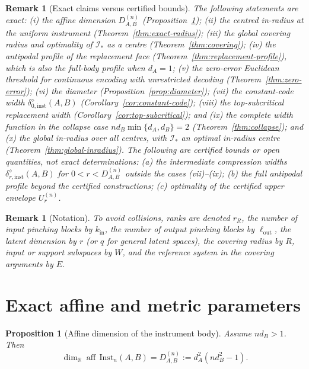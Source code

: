 \documentclass[11pt,a4paper]{article}
\newtheorem{proposition}[theorem]{Proposition}
\newtheorem{remark}[theorem]{Remark}
\newcommand{\Inst}{\mathrm{Inst}}
\newcommand{\aff}{\operatorname{aff}}
\begin{document}
\begin{remark}[Exact claims versus certified bounds]
\label{rem:exact-vs-certified}
The following statements are exact: (i) the affine dimension $D_{A,B}^{(n)}$ (Proposition~\ref{prop:dimension}); (ii) the centred in-radius at the uniform instrument (Theorem~\ref{thm:exact-radius}); (iii) the global covering radius and optimality of $\mathcal I_*$ as a centre (Theorem~\ref{thm:covering}); (iv) the antipodal profile of the replacement face (Theorem~\ref{thm:replacement-profile}), which is also the full-body profile when $d_A=1$; (v) the zero-error Euclidean threshold for continuous encoding with unrestricted decoding (Theorem~\ref{thm:zero-error}); (vi) the diameter (Proposition~\ref{prop:diameter}); (vii) the constant-code width $\delta_{0,\mathrm{inst}}^{\diamond}(A,B)$ (Corollary~\ref{cor:constant-code}); (viii) the top-subcritical replacement width (Corollary~\ref{cor:top-subcritical}); and (ix) the complete width function in the collapse case $nd_B\min\{d_A,d_B\}=2$ (Theorem~\ref{thm:collapse}); and (x) the global in-radius over all centres, with $\mathcal I_*$ an optimal in-radius centre (Theorem~\ref{thm:global-inradius}). The following are certified bounds or open quantities, not exact determinations: (a) the intermediate compression widths $\delta_{r,\mathrm{inst}}^{\diamond}(A,B)$ for $0<r<D_{A,B}^{(n)}$ outside the cases (vii)--(ix); (b) the full antipodal profile beyond the certified constructions; (c) optimality of the certified upper envelope $U_r^{(n)}$.
\end{remark}

\begin{remark}[Notation]
\label{rem:notation}
To avoid collisions, ranks are denoted $r_R$, the number of input pinching blocks by $k_{\mathrm{in}}$, the number of output pinching blocks by $\ell_{\mathrm{out}}$, the latent dimension by $r$ (or $q$ for general latent spaces), the covering radius by $R$, input or support subspaces by $W$, and the reference system in the covering arguments by $E$.
\end{remark}

\section{Exact affine and metric parameters}
\label{sec:exact-geometry}

\begin{proposition}[Affine dimension of the instrument body]
\label{prop:dimension}
Assume $nd_B>1$. Then
\[
\dim_{\mathbb R}\aff\,\Inst_n(A,B)
=D_{A,B}^{(n)}:=d_A^2(nd_B^2-1).
\]
\end{proposition}
\end{document}
